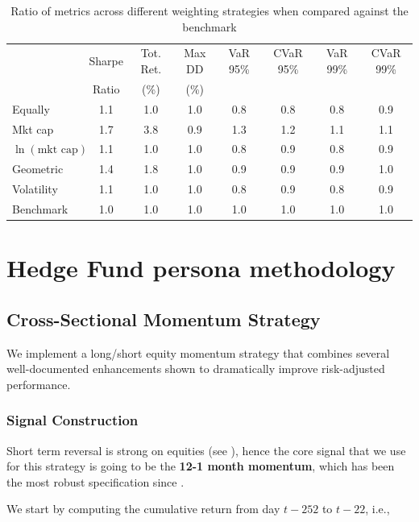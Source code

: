 \documentclass[12pt, a4paper]{article}
\begin{document}
	\begin{table}
		\small
		\centering
		\begin{tabular}{lccccccc}
			\toprule
			& Sharpe & Tot. Ret. & Max DD & VaR 95\% & CVaR 95\% & VaR 99\% & CVaR 99\% \\
			& Ratio & (\%) & (\%) & & & & \\
			\midrule
			Equally & 1.1 & 1.0 & 1.0 & 0.8 & 0.8 & 0.8 & 0.9 \\
			Mkt cap & 1.7 & 3.8 & 0.9 & 1.3 & 1.2 & 1.1 & 1.1 \\
			$\ln{(\text{mkt cap})}$ & 1.1 & 1.0 & 1.0 & 0.8 & 0.9 & 0.8 & 0.9 \\
			Geometric & 1.4 & 1.8 & 1.0 & 0.9 & 0.9 & 0.9 & 1.0 \\
			Volatility & 1.1 & 1.0 & 1.0 & 0.8 & 0.9 & 0.8 & 0.9 \\
			Benchmark & 1.0 & 1.0 & 1.0 & 1.0 & 1.0 & 1.0 & 1.0 \\
			\bottomrule
		\end{tabular}
		\caption{Ratio of metrics across different weighting strategies when compared against the benchmark}
		\label{tbl:comparison_bh_weights_ratio}
	\end{table}
	
	
	
	
	\section{Hedge Fund persona methodology}
		
	\subsection{Cross-Sectional Momentum Strategy}
	\label{sec:momentum}
	
	We implement a long/short equity momentum strategy that combines several well-documented enhancements shown to dramatically improve risk-adjusted performance.
	
	\subsubsection{Signal Construction}
	
	Short term reversal is strong on equities (see \cite{1}), hence the core signal that we use for this strategy is going to be the \textbf{12-1 month momentum}, which has been the most robust specification since \cite{1}. 
	
	We start by computing the cumulative return from day $t-252$ to $t-22$, i.e., 
	
\end{document}
